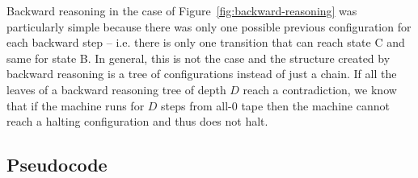 Backward reasoning in the case of Figure~\ref{fig:backward-reasoning} was particularly simple because there was only one possible previous configuration for each backward step -- i.e. there is only one transition that can reach state \textcolor{colorC}{C} and same for state \textcolor{colorB}{B}. In general, this is not the case and the structure created by backward reasoning is a tree of configurations instead of just a chain. If all the leaves of a backward reasoning tree of depth $D$ reach a contradiction, we know that if the machine runs for $D$ steps from all-0 tape then the machine cannot reach a halting configuration and thus does not halt.

\subsection{Pseudocode}

